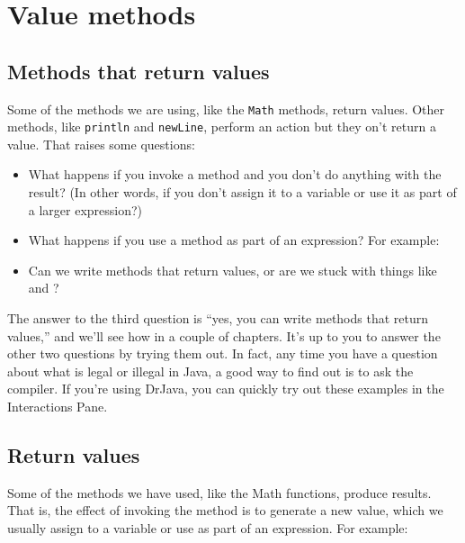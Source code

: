 \documentclass[12pt]{book}
\begin{document}
\chapter{Value methods}
\label{chap05}


\section{Methods that return values}


Some of the methods we are using, like the {\tt Math} methods, return values.
Other methods, like {\tt println} and {\tt newLine}, perform an action but they on't return a value.
That raises some questions:

\begin{itemize}

\item What happens if you invoke a method and you don't do anything with the result?
(In other words, if you don't assign it to a variable or use it as part of a larger expression?)

\item What happens if you use a  method as part of an expression? For example: 

\item Can we write methods that return values, or are we stuck with things like  and ?

\end{itemize}

The answer to the third question is ``yes, you can write methods that return values,'' and we'll see how in a couple of chapters.
It's up to you to answer the other two questions by trying them out.
In fact, any time you have a question about what is legal or illegal in Java, a good way to find out is to ask the compiler.
If you're using DrJava, you can quickly try out these examples in the Interactions Pane.


\section{Return values}


Some of the methods we have used, like the Math functions, produce results.
That is, the effect of invoking the method is to generate a new value, which we usually assign to a variable or use as part of an expression.
For example:
\end{document}

